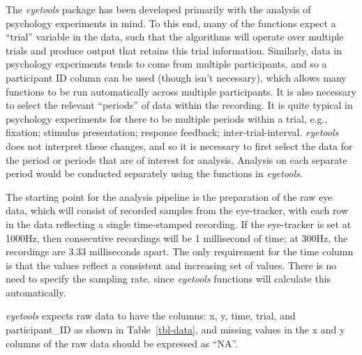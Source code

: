 \documentclass[
  man,
  floatsintext,
  longtable,
  nolmodern,
  notxfonts,
  notimes,
  colorlinks=true,linkcolor=blue,citecolor=blue,urlcolor=blue]{apa7}
\begin{document}
The \emph{eyetools} package has been developed primarily with the
analysis of psychology experiments in mind. To this end, many of the
functions expect a ``trial'' variable in the data, such that the
algorithms will operate over multiple trials and produce output that
retains this trial information. Similarly, data in psychology
experiments tends to come from multiple participants, and so a
participant ID column can be used (though isn't necessary), which allows
many functions to be run automatically across multiple participants. It
is also necessary to select the relevant ``periods'' of data within the
recording. It is quite typical in psychology experiments for there to be
multiple periods within a trial, e.g., fixation; stimulus presentation;
response feedback; inter-trial-interval. \emph{eyetools} does not
interpret these changes, and so it is necessary to first select the data
for the period or periods that are of interest for analysis. Analysis on
each separate period would be conducted separately using the functions
in \emph{eyetools}.

The starting point for the analysis pipeline is the preparation of the
raw eye data, which will consist of recorded samples from the
eye-tracker, with each row in the data reflecting a single time-stamped
recording. If the eye-tracker is set at 1000Hz, then consecutive
recordings will be 1 millisecond of time; at 300Hz, the recordings are
3.33 milliseconds apart. The only requirement for the time column is
that the values reflect a consistent and increasing set of values. There
is no need to specify the sampling rate, since \emph{eyetools} functions
will calculate this automatically.

\emph{eyetools} expects raw data to have the columns: x, y, time, trial,
and participant\_ID as shown in Table~\ref{tbl-data}, and missing values
in the x and y columns of the raw data should be expressed as ``NA''.
\end{document}
